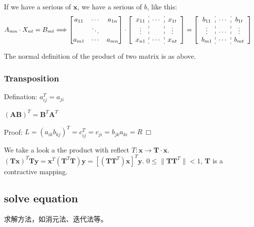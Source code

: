 \documentclass[UTF8]{../../09-Mathematics}
\begin{document}
If we have a serious of $\boldsymbol x$, we have a serious of $b$, like this:
\begin{equation}
  A_{mn} \cdot X_{nt} = B_{mt}
  \Longrightarrow
  \begin{bmatrix}
     a_{11} & \cdots & a_{1n}\\
     & \ddots & \\
     a_{m1} & \cdots & a_{mn} \\
  \end{bmatrix}
  \cdot
  \left[
    \begin{array}{c:c:c}
      x_{11} & \cdots & x_{1t}\\
     \vdots&  & \vdots \\
     x_{n1} & \cdots & x_{nt} \\
    \end{array}
 \right] 
  =
 \left[
    \begin{array}{c:c:c}
      b_{11} & \cdots & b_{1t}\\
      \vdots& \cdots & \vdots \\
      b_{m1} & \cdots & b_{mt} \\
    \end{array}
 \right] 
\end{equation}

The normal definition of the product of two matrix is as above. 

\subsubsection{Transposition}
Defination: $a_{ij}^T = a_{ji}$

\begin{proposition}
    $(\boldsymbol {AB})^T = \boldsymbol B ^T \boldsymbol A^T$

    Proof: $L = (a_{ik}b_{kj})^T = c_{ij}^T = c_{ji} = b_{jk}a_{ki} = R \ \Box$
\end{proposition}

\begin{proposition}
    We take a look a the product with reflect $T : \boldsymbol x \rightarrow  \boldsymbol{T} \cdot \boldsymbol{x}$.
    $(\boldsymbol {Tx})^T \boldsymbol {Ty} = \boldsymbol x^T(\boldsymbol T^T \boldsymbol T) \boldsymbol y = [(\boldsymbol T \boldsymbol T^T) \boldsymbol x]^T \boldsymbol y$. $0 \leqslant \|\boldsymbol T \boldsymbol T^T\| < 1$, $\boldsymbol T$ is a contractive mapping.
\end{proposition}


\subsection{solve equation}
求解方法，如消元法、迭代法等。
\end{document}
